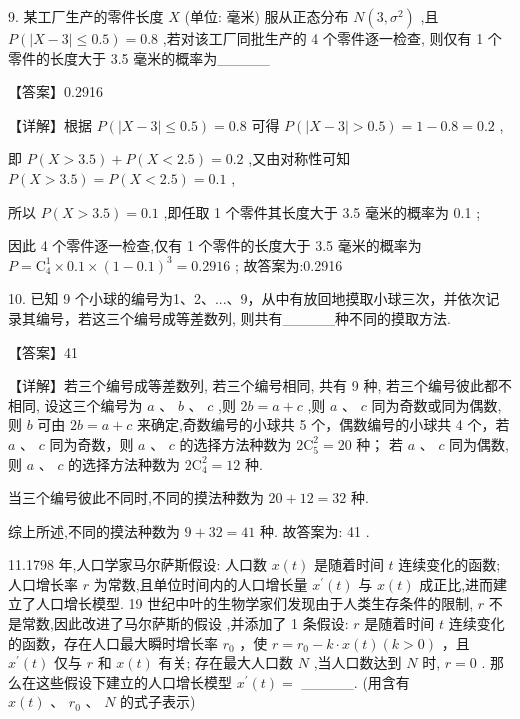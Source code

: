 \documentclass[10pt]{article}
\newcommand*\circled[1]{\tikz[baseline=(char.base)]{\node[shape=circle,draw,inner sep=1.5pt] (char) {\small #1};}}
\begin{document}
9. 某工厂生产的零件长度 \(X\) (单位: 毫米) 服从正态分布 \(N\left( {3,{\sigma }^{2}}\right)\) ,且 \(P\left( {\left| {X - 3}\right|  \leq  {0.5}}\right)  = {0.8}\) ,若对该工厂同批生产的 4 个零件逐一检查, 则仅有 1 个零件的长度大于 3.5 毫米的概率为\_\_\_\_\_

【答案】0.2916

【详解】根据 \(P\left( {\left| {X - 3}\right|  \leq  {0.5}}\right)  = {0.8}\) 可得 \(P\left( {\left| {X - 3}\right|  > {0.5}}\right)  = 1 - {0.8} = {0.2}\) ,

即 \(P\left( {X > {3.5}}\right)  + P\left( {X < {2.5}}\right)  = {0.2}\) ,又由对称性可知 \(P\left( {X > {3.5}}\right)  = P\left( {X < {2.5}}\right)  = {0.1}\) ,

所以 \(P\left( {X > {3.5}}\right)  = {0.1}\) ,即任取 1 个零件其长度大于 3.5 毫米的概率为 0.1 ;

因此 4 个零件逐一检查,仅有 1 个零件的长度大于 3.5 毫米的概率为 \(P = {\mathrm{C}}_{4}^{1} \times  {0.1} \times  {\left( 1 - {0.1}\right) }^{3} = {0.2916}\) ; 故答案为:0.2916

10. 已知 9 个小球的编号为1、2、...、9，从中有放回地摸取小球三次，并依次记录其编号，若这三个编号成等差数列, 则共有\_\_\_\_\_种不同的摸取方法.

【答案】41

【详解】若三个编号成等差数列, 若三个编号相同, 共有 9 种, 若三个编号彼此都不相同, 设这三个编号为 \(a\text{ 、 }b\text{ 、 }c\) ,则 \({2b} = a + c\) ,则 \(a\text{ 、 }c\) 同为奇数或同为偶数,则 \(b\) 可由 \({2b} = a + c\) 来确定,奇数编号的小球共 5 个，偶数编号的小球共 4 个，若 \(a\text{ 、 }c\) 同为奇数，则 \(a\text{ 、 }c\) 的选择方法种数为 \(2{\mathrm{C}}_{5}^{2} = {20}\) 种； 若 \(a\text{ 、 }c\) 同为偶数,则 \(a\text{ 、 }c\) 的选择方法种数为 \(2{\mathrm{C}}_{4}^{2} = {12}\) 种.

当三个编号彼此不同时,不同的摸法种数为 \({20} + {12} = {32}\) 种.

综上所述,不同的摸法种数为 \(9 + {32} = {41}\) 种. 故答案为: 41 .

11.1798 年,人口学家马尔萨斯假设:  \circled{1} 人口数 \(x\left( t\right)\) 是随着时间 \(t\) 连续变化的函数;  \circled{2} 人口增长率 \(r\) 为常数,且单位时间内的人口增长量 \({x}^{\prime }\left( t\right)\) 与 \(x\left( t\right)\) 成正比,进而建立了人口增长模型. 19 世纪中叶的生物学家们发现由于人类生存条件的限制, \(r\) 不是常数,因此改进了马尔萨斯的假设 \circled{2} ,并添加了 1 条假设:  \circled{2}  \(r\) 是随着时间 \(t\) 连续变化的函数，存在人口最大瞬时增长率 \({r}_{0}\) ，使 \(r = {r}_{0} - k \cdot  x\left( t\right) \left( {k > 0}\right)\) ，且 \({x}^{\prime }\left( t\right)\) 仅与 \(r\) 和 \(x\left( t\right)\) 有关;  \circled{3} 存在最大人口数 \(N\) ,当人口数达到 \(N\) 时, \(r = 0\) . 那么在这些假设下建立的人口增长模型 \({x}^{\prime }\left( t\right)  =\) \_\_\_\_\_. (用含有 \(x\left( t\right) \text{ 、 }{r}_{0}\text{ 、 }N\) 的式子表示)
\end{document}

